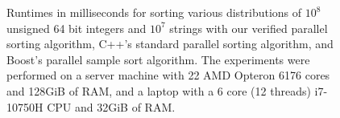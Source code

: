 \documentclass[sn-mathphys,Numbered]{sn-jnl}
\theoremstyle{thmstyleone}%
\theoremstyle{definition}%
\theoremstyle{thmstylethree}%
\begin{document}
  \begin{figure}

  \caption{Runtimes in milliseconds for sorting various distributions of $10^8$ unsigned 64 bit integers and $10^7$ strings with
    our verified parallel sorting algorithm, C++'s standard parallel sorting algorithm, and Boost's parallel sample sort algorithm.
    The experiments were performed on a server machine with 22 AMD Opteron 6176 cores and 128GiB of RAM, and a laptop with a
    6 core (12 threads) i7-10750H CPU and 32GiB of RAM.
  }\label{fig:benchres}
  \end{figure}
\end{document}
